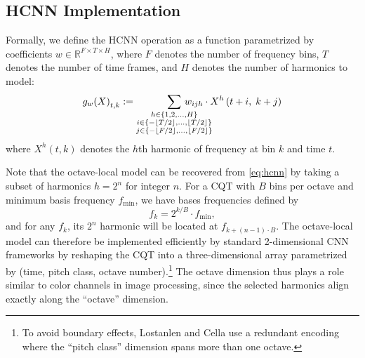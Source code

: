 \documentclass{article}
\begin{document}
\subsection{HCNN Implementation}

Formally, we define the HCNN operation as a function parametrized by coefficients $w \in \mathbb{R}^{F \times T \times H}$, where $F$ denotes the number of frequency bins, $T$ denotes the number of time frames, and $H$ denotes the number of harmonics to model:
\begin{equation}
    {g_w(X)}_{t, k} := 
    \sum_{\substack{%
        h \in \{1, 2, \ldots, H\}\\
        i \in \{-\lfloor T/2\rfloor, \ldots, \lfloor T/2 \rfloor\}\\
        j \in \{-\lfloor F/2\rfloor, \ldots, \lfloor F/2 \rfloor\}}
    }
    \hspace{-3em}%
    w_{ijh} \cdot X^h\left(t + i,\; k + j\right)\label{eq:hcnn}
\end{equation}
where $X^h(t, k)$ denotes the $h$th harmonic of frequency at bin $k$ and time $t$.

Note that the octave-local model can be recovered from \cref{eq:hcnn} by taking a subset of harmonics $h=2^n$ for integer $n$.
For a CQT with $B$ bins per octave and minimum basis frequency $f_{\min}$, we have bases frequencies defined by
\begin{equation}
    f_k = 2^{k/B} \cdot f_{\min}, \label{eq:cqtfreqs}
\end{equation}
and for any $f_k$, its $2^n$ harmonic will be located at $f_{k + (n-1)\cdot B}$.
The octave-local model can therefore be implemented efficiently by standard 2-dimensional CNN frameworks by reshaping the CQT into a three-dimensional array parametrized by (time, pitch class, octave number).\footnote{To avoid boundary effects, Lostanlen and Cella use a redundant encoding where the ``pitch class'' dimension spans more than one octave.}
The octave dimension%
thus plays a role similar to color channels in image processing, since the selected harmonics align exactly along the ``octave'' dimension.

\end{document}
